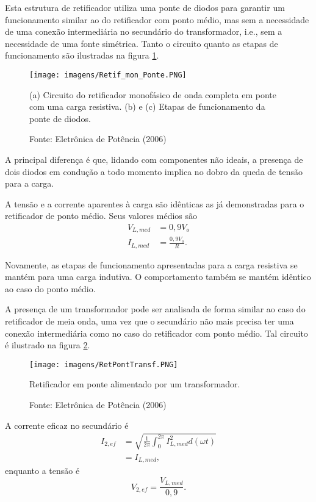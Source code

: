 Esta estrutura de retificador utiliza uma ponte de diodos para garantir um funcionamento similar ao do retificador com ponto médio, mas sem a necessidade de uma conexão intermediária no secundário do transformador, i.e., sem a necessidade de uma fonte simétrica. Tanto o circuito quanto as etapas de funcionamento são ilustradas na figura \ref{fig:CECT}.
 
\begin{figure}[ht]
    \center
    \texttt{[image: imagens/Retif\_mon\_Ponte.PNG]}
    \caption{(a) Circuito do retificador monofásico de onda completa em ponte com uma carga resistiva. (b) e (c) Etapas de funcionamento da ponte de diodos.}\label{fig:CECT}
    \caption*{Fonte: Eletrônica de Potência (2006)}
\end{figure}

A principal diferença é que, lidando com componentes não ideais, a presença de dois diodos em condução a todo momento implica no dobro da queda de tensão para a carga.

A tensão e a corrente aparentes à carga são idênticas as já demonstradas para o retificador de ponto médio. Seus valores médios são
\begin{align*}
    V_{L,med} &= 0,9V_o \\
    I_{L,med} &= \frac{0,9V_o}{R}
.\end{align*}

Novamente, as etapas de funcionamento apresentadas para a carga resistiva se mantém para uma carga indutiva. O comportamento também se mantém idêntico ao caso do ponto médio.

A presença de um transformador pode ser analisada de forma similar ao caso do retificador de meia onda, uma vez que o secundário não mais precisa ter uma conexão intermediária como no caso do retificador com ponto médio. Tal circuito é ilustrado na figura \ref{fig:RPAT}.

\begin{figure}[ht]
    \center
    \texttt{[image: imagens/RetPontTransf.PNG]}
    \caption{Retificador em ponte alimentado por um transformador.}\label{fig:RPAT}
    \caption*{Fonte: Eletrônica de Potência (2006)}
\end{figure}

A corrente eficaz no secundário é 
\begin{align*}
    I_{2,ef} &= \sqrt{ \frac{1}{2\pi} \int_0^{2\pi} I_{L,med}^2 d(\omega{t}) } \\
	      &= I_{L,med}
,\end{align*}
enquanto a tensão é \[
V_{2,ef} = \frac{V_{L,med}}{0,9}
.\] 


